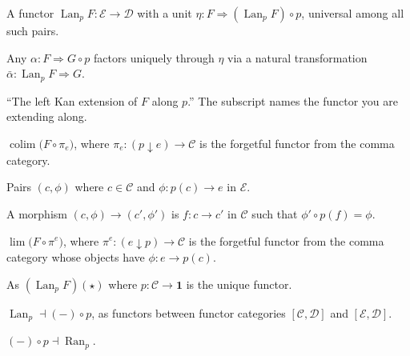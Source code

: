 \begin{exercisesbox}
\begin{qa}
       {A functor $\operatorname{Lan}_p F : \mathcal{E} \to \mathcal{D}$ with a unit
        $\eta : F \Rightarrow (\operatorname{Lan}_p F) \circ p$, universal among all
        such pairs.}

       {Any $\alpha : F \Rightarrow G \circ p$ factors uniquely through $\eta$
        via a natural transformation $\bar{\alpha} : \operatorname{Lan}_p F \Rightarrow G$.}

       {``The left Kan extension of $F$ along $p$.'' The subscript names the
        functor you are extending along.}

       {$\operatorname{colim}\bigl(F \circ \pi_e\bigr)$, where $\pi_e : (p \downarrow e) \to \mathcal{C}$
        is the forgetful functor from the comma category.}

       {Pairs $(c, \phi)$ where $c \in \mathcal{C}$ and $\phi : p(c) \to e$ in $\mathcal{E}$.}

       {A morphism $(c, \phi) \to (c', \phi')$ is $f : c \to c'$ in $\mathcal{C}$
        such that $\phi' \circ p(f) = \phi$.}

       {$\lim\bigl(F \circ \pi^e\bigr)$, where $\pi^e : (e \downarrow p) \to \mathcal{C}$
        is the forgetful functor from the comma category whose objects have
        $\phi : e \to p(c)$.}

       {As $(\operatorname{Lan}_p F)(\star)$ where $p : \mathcal{C} \to \mathbf{1}$
        is the unique functor.}

       {$\operatorname{Lan}_p \dashv (-) \circ p$, as functors between functor
        categories $[\mathcal{C}, \mathcal{D}]$ and $[\mathcal{E}, \mathcal{D}]$.}

       {$(-) \circ p \dashv \operatorname{Ran}_p$.}


\end{qa}
\end{exercisesbox}

